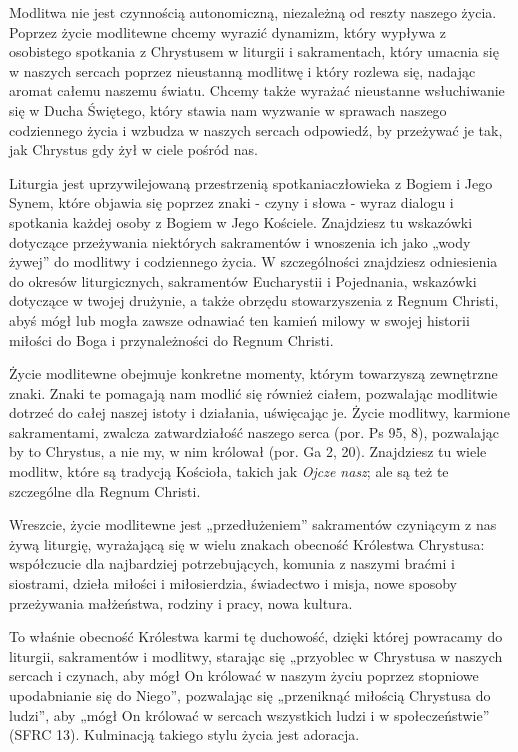 ﻿\documentclass[9pt,twoside]{extarticle}
\begin{document}
{\hnr Modlitwa nie jest czynnością autonomiczną, niezależną od reszty naszego życia. Poprzez życie modlitewne chcemy wyrazić dynamizm, który wypływa z osobistego spotkania z Chrystusem w liturgii i sakramentach, który umacnia się w naszych sercach poprzez nieustanną modlitwę i który rozlewa się, nadając aromat całemu naszemu światu. Chcemy także wyrażać nieustanne wsłuchiwanie się w Ducha Świętego, który stawia nam wyzwanie w sprawach naszego codziennego życia i wzbudza w naszych sercach odpowiedź, by przeżywać je tak, jak Chrystus gdy żył w ciele pośród nas.


Liturgia jest uprzywilejowaną przestrzenią spotkania\linebreak człowieka z Bogiem i Jego Synem, które objawia się poprzez znaki - czyny i słowa - wyraz dialogu i spotkania każdej osoby z Bogiem w Jego Kościele. Znajdziesz tu wskazówki dotyczące przeżywania niektórych sakramentów i wnoszenia ich jako „wody żywej” do modlitwy i codziennego życia. W szczególności znajdziesz odniesienia do okresów liturgicznych, sakramentów Eucharystii i Pojednania, wskazówki dotyczące w twojej drużynie, a także obrzędu stowarzyszenia z Regnum Christi, abyś mógł lub mogła zawsze odnawiać ten kamień milowy w swojej historii miłości do Boga i przynależności do Regnum Christi.


Życie modlitewne obejmuje konkretne momenty, którym towarzyszą zewnętrzne znaki. Znaki te pomagają nam modlić się również ciałem, pozwalając modlitwie dotrzeć do całej naszej istoty i działania, uświęcając je. Życie modlitwy, karmione sakramentami, zwalcza zatwardziałość naszego serca (por. Ps 95, 8), pozwalając by to Chrystus, a nie my, w nim królował (por. Ga 2, 20). Znajdziesz tu wiele modlitw, które są tradycją Kościoła, takich jak {\em Ojcze nasz}; ale są też te szczególne dla Regnum Christi.


Wreszcie, życie modlitewne jest „przedłużeniem” sakramentów czyniącym z nas żywą liturgię, wyrażającą się w wielu znakach obecność Królestwa Chrystusa: współczucie dla najbardziej potrzebujących, komunia z naszymi braćmi i siostrami, dzieła miłości i miłosierdzia, świadectwo i misja, nowe sposoby przeżywania małżeństwa, rodziny i pracy, nowa kultura.


To właśnie obecność Królestwa karmi tę duchowość, dzięki której powracamy do liturgii, sakramentów i modlitwy, starając się „przyoblec w Chrystusa w naszych sercach i czynach, aby mógł On królować w naszym życiu poprzez stopniowe upodabnianie się do Niego”, pozwalając się „przeniknąć miłością Chrystusa do ludzi”, aby „mógł On królować w sercach wszystkich ludzi i w społeczeństwie” (SFRC 13). Kulminacją takiego stylu życia jest adoracja.}
\end{document}
